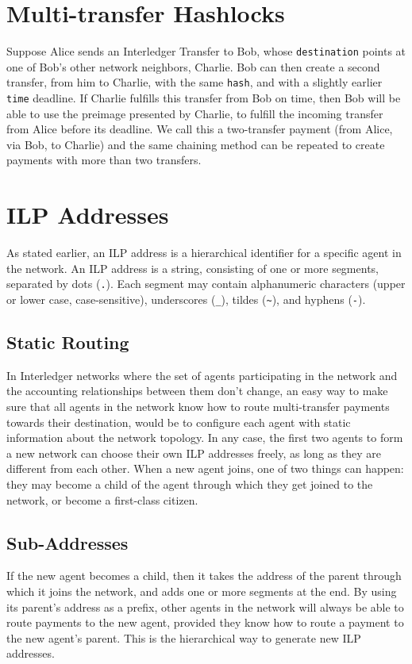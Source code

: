 \documentclass[11pt,twoside,a4paper]{article}
\begin{document}
\section{Multi-transfer Hashlocks}
Suppose Alice sends an Interledger Transfer to Bob, whose {\tt destination} points at one of Bob's other network neighbors, Charlie. Bob can then create a second
transfer, from him to Charlie, with the same {\tt hash}, and with a slightly earlier {\tt time} deadline. If Charlie fulfills this transfer from Bob on time, then Bob will be able
to use the preimage presented by Charlie, to fulfill the incoming transfer from Alice before its deadline. We call this a two-transfer payment (from Alice, via Bob, to Charlie) and the same
chaining method can be repeated to create payments with more than two transfers.

\section{ILP Addresses}
As stated earlier, an ILP address is a hierarchical identifier for a specific agent in the network.
An ILP address is a string, consisting of one or more segments, separated by dots ({\tt .}). Each segment may contain alphanumeric characters (upper or lower case, case-sensitive),
underscores ({\tt \_}),
tildes ({\tt \textasciitilde}),
and hyphens ({\tt -}).

\subsection{Static Routing}
In Interledger networks where the set of agents participating in the network and the accounting relationships between them don't change,
an easy way to make sure that all agents in the network know how to route multi-transfer payments towards their destination, would be to configure each agent with static information about the
network topology.
In any case, the first two agents to form a new network can choose their own ILP addresses freely, as long as they are different from each other. When a new agent joins, one of two things can happen:
they may become a child of the agent through which they get joined to the network, or become a first-class citizen.

\subsection{Sub-Addresses}
If the new agent becomes a child, then it takes the address of the parent through which it joins the network, and adds one or more segments at the end. By using its parent's address as a
prefix, other agents in the network will always be able to route payments to the new agent, provided they know how to route a payment to the new agent's parent. This is the hierarchical
way to generate new ILP addresses.
\end{document}
